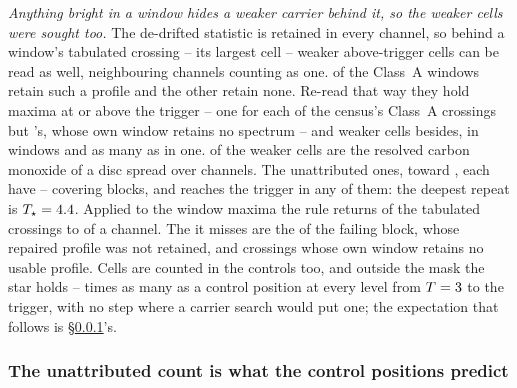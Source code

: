 \emph{Anything bright in a window hides a weaker carrier behind it, so the
weaker cells were sought too.} The de-drifted statistic is retained in every
channel, so behind a window's tabulated crossing -- its largest cell --
weaker above-trigger cells can be read as well, neighbouring channels counting
as one. \CkNWin{} of the \NWinA{} Class~A windows retain such a profile and the
other \CkNWinNotCov{} retain none. Re-read that way they hold \CkNPrimary{}
maxima at or above the trigger -- one for each of the census's
\CkNCrossCenA{} Class~A crossings but \CkMissStar's, whose own window retains
no spectrum -- and \CkNSecondaryWord{} weaker cells besides, in \CkNSecWin{}
windows and as many as \CkNSecMax{} in one. \CkNSecAttr{} of the weaker cells
are the resolved carbon monoxide of a disc spread over channels. The
\CkNSecUnattrWord{} unattributed ones, toward \CkSecStars, each have
\CkCovLo--\CkCovHi{} covering blocks, and \CkNRecurWord{} reaches the trigger
in any of them: the deepest repeat is $T_\star=4.4$. Applied to the window maxima the rule returns \CkRegN{} of the
\EvNCrossRaw{} tabulated crossings to \CkRegDev{} of a channel. The
\CkRegMiss{} it misses are the \EvNCrossFlag{} of the failing block, whose
repaired profile was not retained, and crossings whose own window retains no
usable profile.
Cells are counted in the controls too, and outside the mask the star holds
\CkRatioLo--\CkRatioHi{} times as many as a control position at every level
from $T=3$ to the trigger, with no step where a carrier search would
put one; the expectation that follows is \S\ref{sec:trigunif}'s.

\subsubsection{The unattributed count is what the control positions predict}
\label{sec:trigunif}

